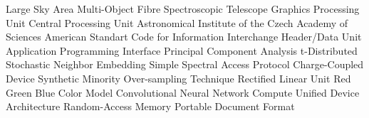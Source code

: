   {Large Sky Area Multi-Object Fibre Spectroscopic Telescope}
     {Graphics Processing Unit}
     {Central Processing Unit}
 {Astronomical Institute of the Czech Academy of Sciences}
   {American Standart Code for Information Interchange}
     {Header/Data Unit}
     {Application Programming Interface}
     {Principal Component Analysis}
   {t-Distributed Stochastic Neighbor Embedding}
    {Simple Spectral Access Protocol}
     {Charge-Coupled Device}
   {Synthetic Minority Over-sampling Technique}
    {Rectified Linear Unit}
     {Red Green Blue Color Model}
     {Convolutional Neural Network}
    {Compute Unified Device Architecture}
     {Random-Access Memory}
     {Portable Document Format}
